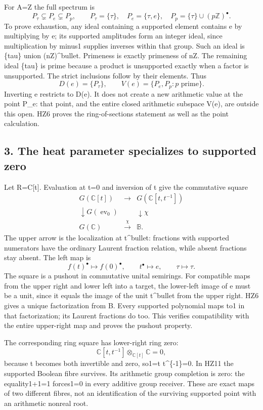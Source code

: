 \documentclass[
]{article}
\begin{document}
For A=Z the full spectrum is \[
P_\tau\subsetneq P_e\subsetneq P_p,\qquad
P_\tau=\{\tau\},\quad P_e=\{\tau,e\},\quad
P_p=\{\tau\}\cup(p\mathbb Z)^\bullet.
\tag{HZ9}
\] To prove exhaustion, any ideal containing a supported element
contains e by multiplying by e; its supported amplitudes form an integer
ideal, since multiplication by minus1 supplies inverses within that
group. Such an ideal is \{tau\} union (nZ)\^{}bullet. Primeness is
exactly primeness of nZ. The remaining ideal \{tau\} is prime because a
product is unsupported exactly when a factor is unsupported. The strict
inclusions follow by their elements. Thus \[
D(e)=\{P_\tau\},\qquad V(e)=\{P_e,P_p:p\text{ prime}\}.
\tag{HZ10}
\] Inverting e restricts to D(e). It does not create a new arithmetic
value at the point P\_e: that point, and the entire closed arithmetic
subspace V(e), are outside this open. HZ6 proves the ring-of-sections
statement as well as the point calculation.

\subsection{3. The heat parameter specializes to supported
zero}\label{the-heat-parameter-specializes-to-supported-zero}

Let R=C{[}t{]}. Evaluation at t=0 and inversion of t give the
commutative square \[
\begin{array}{ccc}
G(\mathbb C[t])&\longrightarrow&G(\mathbb C[t,t^{-1}])\\
\downarrow G(\operatorname{ev}_0)&&\downarrow\chi\\
G(\mathbb C)&\xrightarrow{\chi}&\mathbb B.
\end{array}
\tag{HZ11}
\] The upper arrow is the localization at t\^{}bullet: fractions with
supported numerators have the ordinary Laurent fraction relation, while
absent fractions stay absent. The left map is \[
f(t)^\bullet\longmapsto f(0)^\bullet,\qquad
t^\bullet\longmapsto e,\qquad\tau\longmapsto\tau.
\tag{HZ12}
\] The square is a pushout in commutative unital semirings. For
compatible maps from the upper right and lower left into a target, the
lower-left image of e must be a unit, since it equals the image of the
unit t\^{}bullet from the upper right. HZ6 gives a unique factorization
from B. Every supported polynomial maps to1 in that factorization; its
Laurent fractions do too. This verifies compatibility with the entire
upper-right map and proves the pushout property.

The corresponding ring square has lower-right ring zero: \[
\mathbb C[t,t^{-1}]\otimes_{\mathbb C[t]}\mathbb C=0,
\tag{HZ13}
\] because t becomes both invertible and zero, so1=t t\^{}\{-1\}=0. In
HZ11 the supported Boolean fibre survives. Its arithmetic group
completion is zero: the equality1+1=1 forces1=0 in every additive group
receiver. These are exact maps of two different fibres, not an
identification of the surviving supported point with an arithmetic
nonreal root.
\end{document}
